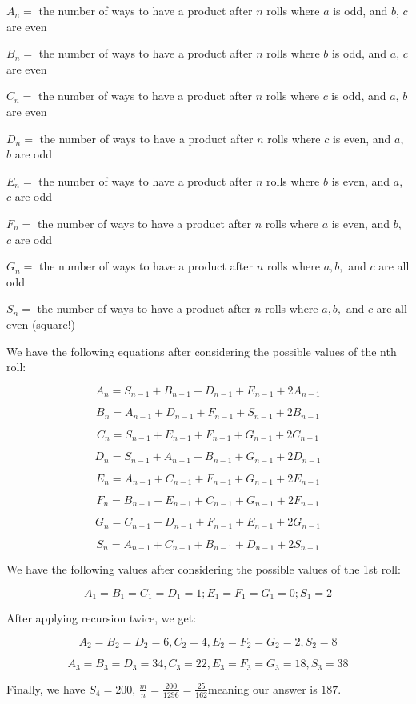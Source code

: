 \begin{enumerate}
 $A_{n} =$ the number of ways to have a product after $n$ rolls where $a$ is odd, and $b$, $c$ are even

 $B_{n} =$ the number of ways to have a product after $n$ rolls where $b$ is odd, and $a$, $c$ are even

 $C_{n} =$ the number of ways to have a product after $n$ rolls where $c$ is odd, and $a$, $b$ are even

 $D_{n} =$ the number of ways to have a product after $n$ rolls where $c$ is even, and $a$, $b$ are odd

 $E_{n} =$ the number of ways to have a product after $n$ rolls where $b$ is even, and $a$, $c$ are odd

 $F_{n} =$ the number of ways to have a product after $n$ rolls where $a$ is even, and $b$, $c$ are odd

 $G_{n} =$ the number of ways to have a product after $n$ rolls where $a, b,$ and $c$ are all odd

 $S_{n} =$ the number of ways to have a product after $n$ rolls where $a, b,$ and $c$ are all even (square!)

 We have the following equations after considering the possible values of the nth roll:

 
 \[A_{n} = S_{n-1}+B_{n-1}+D_{n-1}+E_{n-1}+2A_{n-1}\]

 \[B_{n} = A_{n-1}+D_{n-1}+F_{n-1}+S_{n-1}+2B_{n-1}\]

 \[C_{n} = S_{n-1}+E_{n-1}+F_{n-1}+G_{n-1}+2C_{n-1}\]

 \[D_{n} = S_{n-1}+A_{n-1}+B_{n-1}+G_{n-1}+2D_{n-1}\]

 \[E_{n} = A_{n-1}+C_{n-1}+F_{n-1}+G_{n-1}+2E_{n-1}\]

 \[F_{n} = B_{n-1}+E_{n-1}+C_{n-1}+G_{n-1}+2F_{n-1}\]

 \[G_{n} = C_{n-1}+D_{n-1}+F_{n-1}+E_{n-1}+2G_{n-1}\]

 \[S_{n} = A_{n-1}+C_{n-1}+B_{n-1}+D_{n-1}+2S_{n-1}\]

 We have the following values after considering the possible values of the 1st roll:

 
 \[A_1 = B_1 = C_1 = D_1 = 1; E_1 = F_1 = G_1 = 0; S_1 = 2\]

 After applying recursion twice, we get:

 
 \[A_2 = B_2 = D_2 = 6, C_2 = 4, E_2 = F_2 = G_2 = 2, S_2 = 8\]

 \[A_3 = B_3 = D_3 = 34, C_3 = 22, E_3 = F_3 = G_3 = 18, S_3 = 38\]

 Finally, we have $S_4 = 200$, $\frac{m}{n} = \frac{200}{1296} = \frac{25}{162}$meaning our answer is $\boxed{187}$.


\end{enumerate}

